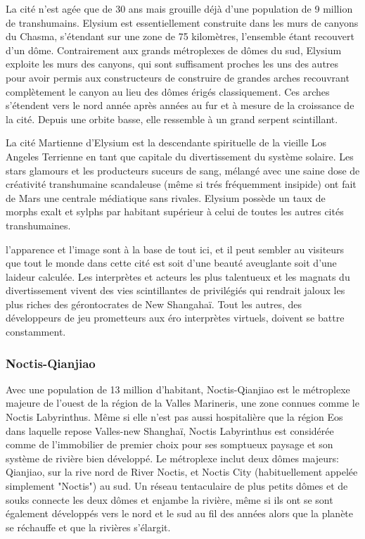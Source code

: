                                                            La cité n'est agée que de 30 ans mais grouille déjà d'une population de 9 million de transhumains. Elysium est essentiellement construite dans les murs de canyons du Chasma, s'étendant sur une zone de 75 kilomètres, l'ensemble étant recouvert d'un dôme. Contrairement aux grands métroplexes de dômes du sud, Elysium exploite les murs des canyons, qui sont suffisament proches les uns des autres pour avoir permis aux constructeurs de construire de grandes arches recouvrant complètement le canyon au lieu des dômes érigés classiquement. Ces arches s'étendent vers le nord année après années au fur et à mesure de la croissance de la cité. Depuis une orbite basse, elle ressemble à un grand serpent scintillant. 

                                                            La cité Martienne d'Elysium est la descendante spirituelle de la vieille Los Angeles Terrienne en tant que capitale du divertissement du système solaire. Les stars glamours et les producteurs suceurs de sang, mélangé avec une saine dose de créativité transhumaine scandaleuse (même si trés fréquemment insipide) ont fait de Mars une centrale médiatique sans rivales. Elysium possède un taux de morphs exalt et sylphs par habitant supérieur à celui de toutes les autres cités transhumaines. 

                                                            l'apparence et l'image sont à la base de tout ici, et il peut sembler au visiteurs que tout le monde dans cette cité est soit d'une beauté aveuglante soit d'une laideur calculée. Les interprètes et acteurs les plus talentueux et les magnats du divertissement vivent des vies scintillantes de privilégiés qui rendrait jaloux les plus riches des gérontocrates de New Shangahaï. Tout les autres, des développeurs de jeu prometteurs aux éro interprètes virtuels, doivent se battre constamment. 

                                                            \subsubsection{Noctis-Qianjiao} \label{sec:noctis-qianjiao} 

                                                            Avec une population de 13 million d'habitant, Noctis-Qianjiao est le métroplexe majeure de l'ouest de la région de la Valles Marineris, une zone connues comme le Noctis Labyrinthus. Même si elle n'est pas aussi hospitalière que la région Eos dans laquelle repose Valles-new Shanghaï, Noctis Labyrinthus est considérée comme de l'immobilier de premier choix pour ses somptueux paysage et son système de rivière bien développé. Le métroplexe inclut deux dômes majeurs: Qianjiao, sur la rive nord de River Noctis, et Noctis City (habituellement appelée simplement "Noctis") au sud. Un réseau tentaculaire de plus petits dômes et de souks connecte les deux dômes et enjambe la rivière, même si ils ont se sont également développés vers le nord et le sud au fil des années alors que la planète se réchauffe et que la rivières s'élargit. 

